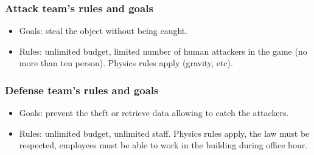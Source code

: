 \documentclass[11pt]{article} %
\begin{document}
\subsubsection{Attack team's rules and goals}
\begin{itemize}
\item Goals: steal the object without being caught.
\item Rules: unlimited budget, limited number of human attackers 
in the game (no more than ten person). Physics rules apply (gravity, etc).
\end{itemize}

\subsubsection{Defense team's rules and goals}
\begin{itemize}
\item Goals: prevent the theft or retrieve data allowing to catch the attackers.
\item Rules: unlimited budget, unlimited staff. Physics rules apply, the law must be respected, 
employees must be able to work in the building during office hour.
\end{itemize}


\end{document}
